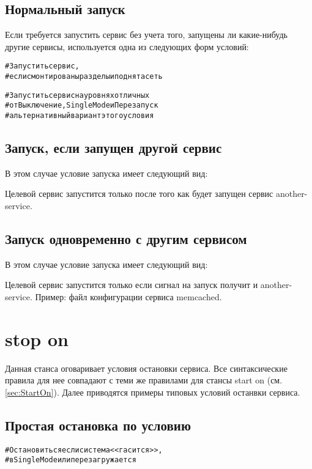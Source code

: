 \subsection{Нормальный запуск}
Если требуется запустить сервис без учета того, запущены ли какие-нибудь другие сервисы, используется одна из следующих форм условий: \begin{alltt}
 #Запустить сервис, 
										#если смонтированы разделы и поднята сеть

 #Запустить сервис на уровнях отличных 
									#от Выключение, Single Mode и Перезапуск
	#альтернативный вариант этого условия
\end{alltt}
\subsection{Запуск, если запущен другой сервис}
В этом случае условие запуска имеет следующий вид: \begin{alltt}
\end{alltt}
Целевой сервис запустится только после того как будет запущен сервис another-service.
\subsection{Запуск одновременно с другим сервисом}
В этом случае условие запуска имеет следующий вид: \begin{alltt}
\end{alltt}
Целевой сервис запустится только если сигнал на запуск получит и another-service.
Пример: файл конфигурации сервиса memcached. \begin{alltt}
\end{alltt}
\section{stop on} \label{sec:StopOn}
Данная станса оговаривает условия остановки сервиса. Все синтаксические правила для нее совпадают с теми же правилами для стансы start on (см. \autoref{sec:StartOn}). Далее приводятся примеры типовых условий останвки сервиса.
\subsection{Простая остановка по условию}
\begin{alltt}
 #Остановиться если система <<гасится>>,
				#в Single Mode или перезагружается
\end{alltt} 
